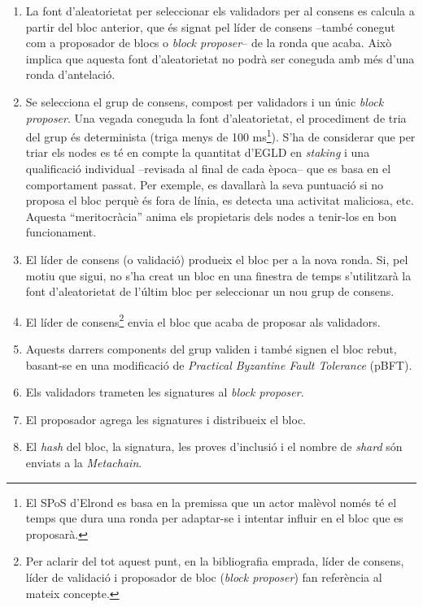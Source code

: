 \documentclass[11pt,a4paper]{article}
\begin{document}
\begin{enumerate}
    \item La font d'aleatorietat per seleccionar els validadors per al consens es calcula a partir del bloc anterior, que és signat pel líder de consens –també conegut com a proposador de blocs o \textit{block proposer}– de la ronda que acaba. Això implica que aquesta font d'aleatorietat no podrà ser coneguda amb més d'una ronda d'antelació.
    \item Se selecciona el grup de consens, compost per validadors i un únic \textit{block proposer}. Una vegada coneguda la font d'aleatorietat, el procediment de tria del grup és determinista (triga menys de 100 ms\footnote{El SPoS d'Elrond es basa en la premissa que un actor malèvol només té el temps que dura una ronda per adaptar-se i intentar influir en el bloc que es proposarà.}). S'ha de considerar que per triar els nodes es té en compte la quantitat d'EGLD en \textit{staking} i una qualificació individual –revisada al final de cada època– que es basa en el comportament passat. Per exemple, es davallarà la seva puntuació si no proposa el bloc perquè és fora de línia, es detecta una activitat maliciosa, etc. Aquesta ``meritocràcia'' anima els propietaris dels nodes a tenir-los en bon funcionament. 
    \item  El líder de consens (o validació) produeix el  bloc per a la nova ronda. Si, pel motiu que sigui, no s'ha creat un bloc en una finestra de temps s'utilitzarà la font d'aleatorietat de l'últim bloc per seleccionar un nou grup de consens.
    \item El líder de consens\footnote{Per aclarir del tot aquest punt, en la bibliografia emprada, líder de consens, líder de validació i proposador de bloc (\textit{block proposer}) fan referència al mateix concepte.} envia el bloc que acaba de proposar als validadors.
    \item  Aquests darrers components del grup validen i també signen el bloc rebut, basant-se en una modificació de \textit{Practical Byzantine Fault Tolerance} (pBFT).
    \item Els validadors trameten les signatures al \textit{block proposer}.
    \item El proposador agrega les signatures i distribueix el bloc.
    \item El \textit{hash} del bloc, la signatura, les proves d'inclusió i el nombre de \textit{shard} són enviats a la \textit{Metachain}. 
\end{enumerate}
\end{document}
